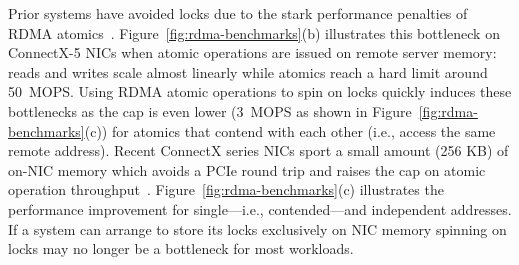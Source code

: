 
Prior systems have avoided locks due to the stark performance
penalties of RDMA atomics~\cite{design-guidelines}.
Figure~\ref{fig:rdma-benchmarks}(b) illustrates this bottleneck on
ConnectX-5 NICs when atomic operations are issued on remote server
memory: reads and writes scale almost linearly while atomics reach a
hard limit around 50~MOPS.  Using RDMA atomic operations to spin on
locks quickly induces these bottlenecks as the cap is even lower
(3~MOPS as shown in Figure~\ref{fig:rdma-benchmarks}(c)) for atomics
that contend with each other (i.e., access the same remote address).
Recent ConnectX series NICs sport a small amount (256 KB) of on-NIC
memory which avoids a PCIe round trip and raises the cap on atomic
operation
throughput~\cite{device-memory,sherman}. Figure~\ref{fig:rdma-benchmarks}(c)
illustrates the performance improvement for
single---i.e., contended---and independent addresses. If a system can arrange to store its locks exclusively on NIC memory spinning on locks may no
longer be a bottleneck for most workloads.





